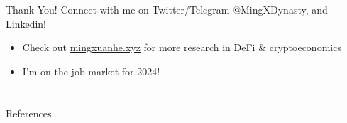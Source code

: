 \documentclass{beamer}
\begin{document}
\begin{frame}{Thank You!}
    Connect with me on Twitter/Telegram @MingXDynasty, and Linkedin!\\ 
    \bigskip
    \begin{itemize}
        \item Check out \href{https://www.mingxuanhe.xyz/}{\underline{mingxuanhe.xyz}} for more research in DeFi \& cryptoeconomics
        \item I'm on the job market for 2024!
 
    \end{itemize}
   

\end{frame}

\section*{}

\begin{frame}[allowframebreaks]{References}
    \nocite{*}
    \printbibliography
\end{frame}
\end{document}
